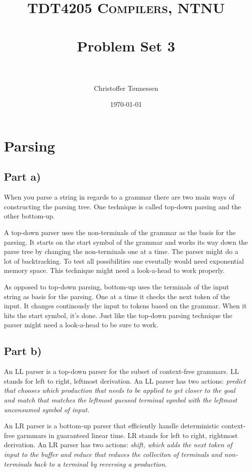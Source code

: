 \documentclass[paper=a4, fontsize=11pt]{scrartcl} %
\title{ 
\normalfont \normalsize 
\textsc{TDT4205 Compilers, NTNU} \\ [25pt] %
\horrule{0.5pt} \\[0.4cm] %
\huge Problem Set 3 \\ %
\horrule{2pt} \\[0.5cm] %
}
\author{Christoffer Tønnessen} %
\date{\normalsize\today} %
\numberwithin{equation}{section} %
\numberwithin{figure}{section} %
\numberwithin{table}{section} %
\begin{document}
\maketitle %

\section{Parsing}
\subsection{Part a)}
When you parse a string in regards to a grammar there are two main ways of constructing the parsing tree. One technique is called top-down parsing and the other bottom-up.

A top-down parser uses the non-terminals of the grammar as the basis for the parsing. It starts on the start symbol of the grammar and works its way down the parse tree by changing the non-terminals one at a time. The parser might do a lot of backtracking. To test all possibilities one eveutally would need exponential memory space. This technique might need a look-a-head to work properly.

As opposed to top-down parsing, bottom-up uses the terminals of the input string as basis for the parsing. One at a time it checks the next token of the input. It changes continously the input to tokens based on the grammar. When it hits the start symbol, it's done. Just like the top-down parsing technique the parser might need a look-a-head to be sure to work.
\subsection{Part b)}
An LL parser is a top-down parser for the subset of context-free grammars. LL stands for left to right, leftmost derivation. An LL parser has two actions: \em{predict} that chooses which production that needs to be applied to get closer to the goal and \em{match} that matches the leftmost guessed terminal symbol with the leftmost unconsumed symbol of input.

An LR parser is a bottom-up parser that efficiently handle deterministic context-free garmmars in guaranteed linear time. LR stands for left to right, rightmost derivation. An LR parser has two actions: \em{shift}, which adds the next token of input to the buffer and \em{reduce} that reduces the colleciton of terminals and non-terminals back to a terminal by reversing a production.
\end{document}
